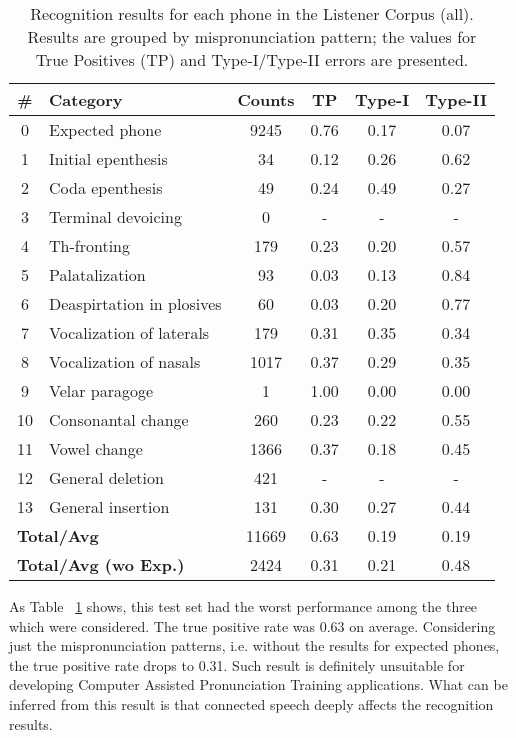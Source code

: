 \documentclass[twocolumn]{bmcart}%
\begin{document}
\small
\setlength{\tabcolsep}{0.3em}
\begin{table}[ht!]
\caption{Recognition results for each phone in the Listener Corpus (all). Results are grouped by mispronunciation pattern; the values for True Positives (TP) and Type-I/Type-II errors are presented.}
\begin{tabular}{clcccc} \hline
\textbf{\#} & \textbf{Category} & \textbf{Counts} & \textbf{TP} & \textbf{Type-I} & \textbf{Type-II} \\ \hline
0 & Expected phone & 9245 & 0.76 & 0.17 & 0.07 \\
1 & Initial epenthesis & 34 & 0.12 & 0.26 & 0.62 \\
2 & Coda epenthesis & 49 & 0.24 & 0.49 & 0.27 \\
3 & Terminal devoicing & 0 & - & - & - \\
4 & Th-fronting & 179 & 0.23 & 0.20 & 0.57 \\
5 & Palatalization & 93 & 0.03 & 0.13 & 0.84 \\
6 & Deaspirtation in plosives & 60 & 0.03 & 0.20 & 0.77 \\
7 & Vocalization of laterals & 179 & 0.31 & 0.35 & 0.34 \\
8 & Vocalization of nasals & 1017 & 0.37 & 0.29 & 0.35 \\
9 & Velar paragoge & 1 & 1.00 & 0.00 & 0.00 \\
10 & Consonantal change & 260 & 0.23 & 0.22 & 0.55 \\
11 & Vowel change & 1366 & 0.37 & 0.18 & 0.45 \\
12 & General deletion & 421 & - & - & - \\
13 & General insertion & 131 & 0.30 & 0.27 & 0.44 \\ \hline 
\multicolumn{2}{l}{\textbf{Total/Avg}} & 11669 & 0.63 & 0.19 & 0.19 \\ 
\multicolumn{2}{l}{\textbf{Total/Avg (wo Exp.)}} & 2424 & 0.31 & 0.21 & 0.48 \\ \hline
\end{tabular}
\label{rec-listener-all}
\end{table}
\normalsize

As Table ~\ref{rec-listener-all} shows, this test set had the worst performance among the three which were considered. The true positive rate was 0.63 on average. Considering just the mispronunciation patterns, i.e. without the results for expected phones, the true positive rate drops to 0.31. Such result is definitely unsuitable for developing Computer Assisted Pronunciation Training applications. What can be inferred from this result is that connected speech deeply affects the recognition results.
\end{document}
